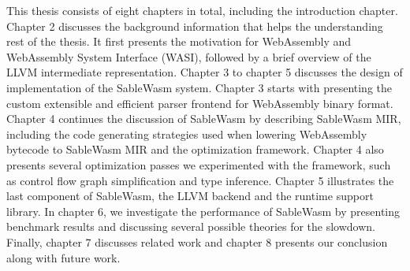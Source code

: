 This thesis consists of eight chapters in total, including the introduction
chapter. Chapter 2 discusses the background information that helps the
understanding rest of the thesis. It first presents the motivation for
WebAssembly and WebAssembly System Interface (WASI), followed by a brief
overview of the LLVM intermediate representation. Chapter 3 to chapter 5
discusses the design of implementation of the SableWasm system. Chapter 3 starts
with presenting the custom extensible and efficient parser frontend for
WebAssembly binary format. Chapter 4 continues the discussion of SableWasm by
describing SableWasm MIR, including the code generating strategies used when
lowering WebAssembly bytecode to SableWasm MIR and the optimization framework.
Chapter 4 also presents several optimization passes we experimented with the
framework, such as control flow graph simplification and type inference.
Chapter 5 illustrates the last component of SableWasm, the LLVM backend and the
runtime support library. In chapter 6, we investigate the performance of
SableWasm by presenting benchmark results and discussing several possible
theories for the slowdown. Finally, chapter 7 discusses related work and
chapter 8 presents our conclusion along with future work.